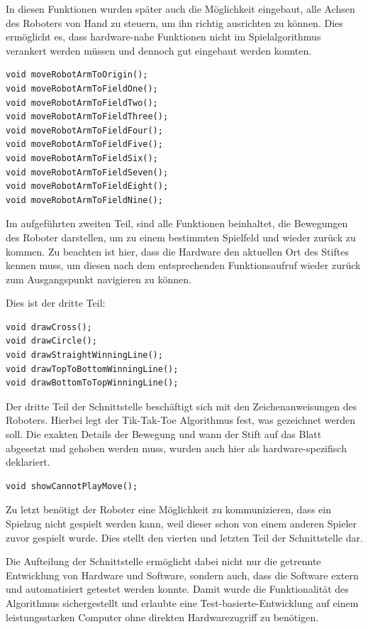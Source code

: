 \documentclass[conference,compsoc,final,a4paper]{IEEEtran}
\begin{document}
In diesen Funktionen wurden später auch die Möglichkeit eingebaut, alle Achsen des Roboters von 
Hand zu steuern, um ihn richtig ausrichten zu können. Dies ermöglicht es, dass hardware-nahe Funktionen
nicht im Spielalgorithmus verankert werden müssen und dennoch gut eingebaut werden konnten.

\begin{verbatim}
void moveRobotArmToOrigin();
void moveRobotArmToFieldOne();
void moveRobotArmToFieldTwo();
void moveRobotArmToFieldThree();
void moveRobotArmToFieldFour();
void moveRobotArmToFieldFive();
void moveRobotArmToFieldSix();
void moveRobotArmToFieldSeven();
void moveRobotArmToFieldEight();
void moveRobotArmToFieldNine();
\end{verbatim}

Im aufgeführten zweiten Teil, sind alle Funktionen beinhaltet, die Bewegungen des Roboter darstellen, um zu
einem bestimmten Spielfeld und wieder zurück zu kommen. Zu beachten ist hier, dass die Hardware den aktuellen
Ort des Stiftes kennen muss, um diesen nach dem entsprechenden Funktionsaufruf wieder zurück zum Ausgangspunkt
navigieren zu können.

Dies ist der dritte Teil:

\begin{verbatim}
void drawCross();
void drawCircle();
void drawStraightWinningLine();
void drawTopToBottomWinningLine();
void drawBottomToTopWinningLine();
\end{verbatim}

Der dritte Teil der Schnittstelle beschäftigt sich mit den Zeichenanweisungen des Roboters. Hierbei legt der
Tik-Tak-Toe Algorithmus fest, was gezeichnet werden soll. Die exakten Details der Bewegung und wann der Stift
auf das Blatt abgesetzt und gehoben werden muss, wurden auch hier als hardware-spezifisch deklariert.

\begin{verbatim}
void showCannotPlayMove();
\end{verbatim}

Zu letzt benötigt der Roboter eine Möglichkeit zu kommunizieren, dass ein Spielzug nicht gespielt werden kann,
weil dieser schon von einem anderen Spieler zuvor gespielt wurde. Dies stellt den vierten und letzten Teil der
Schnittstelle dar.

Die Aufteilung der Schnittstelle ermöglicht dabei nicht nur die getrennte Entwicklung von Hardware und Software,
sondern auch, dass die Software extern und automatisiert getestet werden konnte. Damit wurde die Funktionalität des Algorithmus
sichergestellt und erlaubte eine Test-basierte-Entwicklung auf einem leistungsstarken Computer ohne direkten
Hardwarezugriff zu benötigen.
\end{document}
